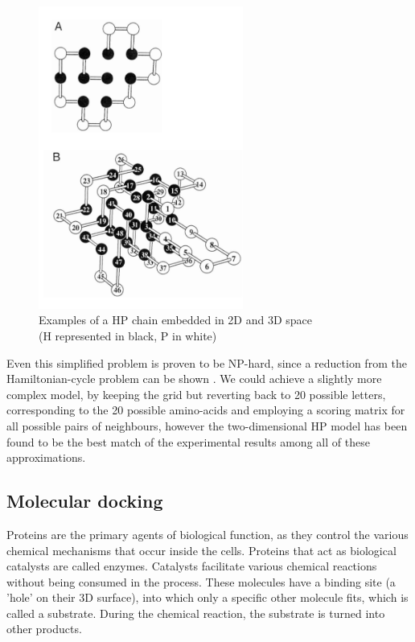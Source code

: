 \begin{figure}[H]
    \centering
    \includegraphics[width=0.6\textwidth]{figures/bioinformatics/hp_model.png}
    \caption{Examples of a HP chain embedded in 2D and 3D space\\(H represented in black, P in white)\cite{dill_principles_2008}}
\end{figure}

Even this simplified problem is proven to be NP-hard, since a reduction from the Hamiltonian-cycle problem can be shown \cite{crescenzi_complexity_1998}. We could achieve a slightly more complex model, by keeping the grid but reverting back to 20 possible letters, corresponding to the 20 possible amino-acids and employing a scoring matrix for all possible pairs of neighbours, however the two-dimensional HP model has been found to be the best match of the experimental results among all of these approximations. \cite{crescenzi_complexity_1998}

\subsection{Molecular docking}

Proteins are the primary agents of biological function, as they control the various chemical mechanisms that occur inside the cells. Proteins that act as biological catalysts are called enzymes. Catalysts facilitate various chemical reactions without being consumed in the process. These molecules have a binding site (a 'hole' on their 3D surface), into which only a specific other molecule fits, which is called a substrate. During the chemical reaction, the substrate is turned into other products.  \cite{fionda_networks_2019}

